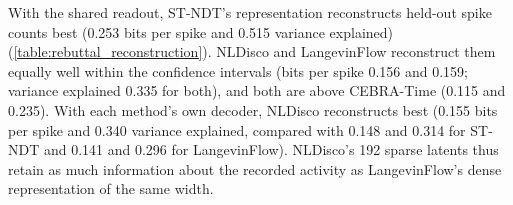 With the shared readout, ST-NDT's representation reconstructs held-out spike counts best (0.253 bits per spike and 0.515 variance explained) (\autoref{table:rebuttal_reconstruction}). NLDisco and LangevinFlow reconstruct them equally well within the confidence intervals (bits per spike 0.156 and 0.159; variance explained 0.335 for both), and both are above CEBRA-Time (0.115 and 0.235). With each method's own decoder, NLDisco reconstructs best (0.155 bits per spike and 0.340 variance explained, compared with 0.148 and 0.314 for ST-NDT and 0.141 and 0.296 for LangevinFlow). NLDisco's 192 sparse latents thus retain as much information about the recorded activity as LangevinFlow's dense representation of the same width.

\begin{table}[!htbp]
    \centering
    {\small\setlength{\tabcolsep}{4pt}
    }
    \caption{\textbf{Final-bin spike-count reconstruction on held-out test trials.} Each representation (192-dimensional; 191 for ST-NDT) predicts the counts of all 191 channels in the bin it is aligned to. The shared readout is the same validation-tuned L2 Poisson regression for every method; the native columns use each model's own decoder. Brackets: 95\% whole-trial bootstrap intervals. Column maxima at the displayed precision are bolded.}
    \label{table:rebuttal_reconstruction}
\end{table}
